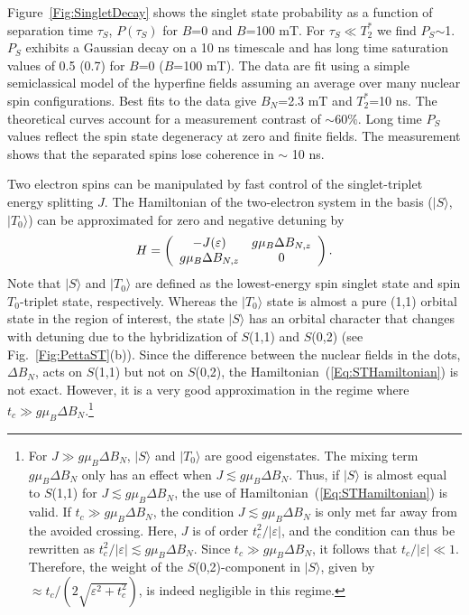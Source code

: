 \documentclass[12pt,aps,nofootinbib]{revtex4-1}
\begin{document}
Figure~\ref{Fig:SingletDecay} shows the singlet state probability
as a function of separation time $\tau_S$, $P(\tau_S)$ for $B$=0
and $B$=100 mT. For $\tau_S$$\ll$$T_2^*$ we find $P_S$$\sim$1.
$P_S$ exhibits a Gaussian decay on a 10 ns timescale and has long
time saturation values of 0.5 (0.7) for $B$=0 ($B$=100 mT). The
data are fit using a simple semiclassical model of the hyperfine
fields assuming an average over many nuclear spin configurations.
Best fits to the data give $B_{N}$=2.3 mT and $T_2^*$=10 ns. The
theoretical curves account for a measurement contrast of
$\sim$60$\%$. Long time $P_S$ values reflect the spin state
degeneracy at zero and finite fields. The measurement shows that
the separated spins lose coherence in $\sim$ 10 ns.

Two electron spins can be manipulated by fast control of the singlet-triplet energy splitting $J$. The Hamiltonian of the two-electron system in the basis ($|S \rangle$, $|T_0 \rangle$) can be approximated for zero and negative detuning by
\begin{equation}
H= \left(\begin{array}{c c}
-J(\varepsilon) & g \mu_B \Delta B_{N,z}\\
g \mu_B \Delta B_{N,z} & 0 \end{array}\right).
	\label{Eq:STHamiltonian}
\end{equation}
Note that $|S \rangle$ and $|T_0 \rangle$ are defined as the lowest-energy spin singlet state and spin $T_0$-triplet state, respectively. Whereas the $|T_0 \rangle$ state is almost a pure (1,1) orbital state in the region of interest, the state $|S \rangle$ has an orbital character that changes with detuning due to the hybridization of $S$(1,1) and $S$(0,2) (see Fig.~\ref{Fig:PettaST}(b)). Since the difference between the nuclear fields in the dots, $\Delta B_{N}$, acts on $S$(1,1) but not on $S$(0,2), the Hamiltonian~(\ref{Eq:STHamiltonian}) is not exact. However, it is a very good approximation in the regime where $t_c \gg g \mu_B \Delta B_{N}$.\footnote{For $J \gg g \mu_B \Delta B_{N}$, $|S \rangle$ and $|T_0 \rangle$ are good eigenstates. The mixing term $g \mu_B \Delta B_{N}$ only has an effect when $J \lesssim g \mu_B \Delta B_{N}$. Thus, if $|S \rangle$ is almost equal to $S$(1,1) for $J \lesssim g \mu_B \Delta B_{N}$, the use of Hamiltonian~(\ref{Eq:STHamiltonian}) is valid. If $t_c \gg g \mu_B \Delta B_{N}$, the condition $J \lesssim g \mu_B \Delta B_{N}$ is only met far away from the avoided crossing. Here, $J$ is of order $t^2_c/\left| \varepsilon \right|$, and the condition can thus be rewritten as $t^2_c/\left| \varepsilon \right| \lesssim g \mu_B \Delta B_{N}$. Since $t_c \gg g \mu_B \Delta B_{N}$, it follows that $t_c/\left| \varepsilon \right| \ll 1$. Therefore, the weight of the $S$(0,2)-component in $|S \rangle$, given by $\approx t_c/(2\sqrt{\varepsilon^2 + t^2_c})$, is indeed negligible in this regime.}
\end{document}
